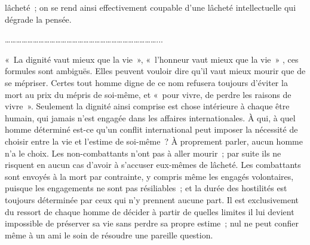 \documentclass[french,twoside]{book} %
\begin{document}
lâcheté ; on se rend ainsi effectivement coupable d'une lâcheté intellectuelle qui dégrade la pensée.\par
………………………………………………………………………...\par
« La dignité vaut mieux que la vie », « l'honneur vaut mieux que la vie » , ces formules sont ambiguës. Elles peuvent vouloir dire qu'il vaut mieux mourir que de se mépriser. Certes tout homme digne de ce nom refusera toujours d'éviter la mort au prix du mépris de soi-même, et « pour vivre, de perdre les raisons de vivre ». Seulement la dignité ainsi comprise est chose intérieure à chaque être humain, qui jamais n'est engagée dans les affaires internationales. À qui, à quel homme déterminé est-ce qu'un conflit interna­tional peut imposer la nécessité de choisir entre la vie et l'estime de soi-même ? À proprement parler, aucun homme n'a le choix. Les non-combattants n'ont pas à aller mourir ; par suite ils ne risquent en aucun cas d'avoir à s'accuser eux-mêmes de lâcheté. Les combattants sont envoyés à la mort par contrainte, y compris même les engagés volontaires, puisque les engagements ne sont pas résiliables ; et la durée des hostilités est toujours déterminée par ceux qui n'y prennent aucune part. Il est exclusivement du ressort de chaque homme de décider à partir de quelles limites il lui devient impossible de préserver sa vie sans perdre sa propre estime ; nul ne peut confier même à un ami le soin de résoudre une pareille question.
\end{document}

